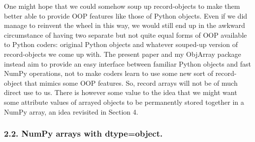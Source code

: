 \documentclass[letterpaper,compsoc,twoside]{IEEEtran}
\begin{document}
One might hope that we could somehow \textquotedbl{}soup up\textquotedbl{} record-objects to make them better able to provide OOP features like those of Python objects.  Even if we did manage to reinvent the wheel in this way, we would still end up in the awkward circumstance of having two \textquotedbl{}separate but not quite equal\textquotedbl{} forms of OOP available to Python coders:  original Python objects and whatever souped-up version of record-objects we come up with.  The present paper and my ObjArray package instead aim to provide an easy interface between familiar Python objects and fast NumPy operations, not to make coders learn to use some new sort of \textquotedbl{}record-object\textquotedbl{} that mimics some OOP features.  So, record arrays will not be of much direct use to us.  There is however some value to the idea that we might want some attribute values of arrayed objects to be permanently stored together in a NumPy array, an idea revisited in Section 4.

\subsubsection{2.2.  NumPy arrays with dtype=object.%
  \label{numpy-arrays-with-dtype-object}%
}
\end{document}
